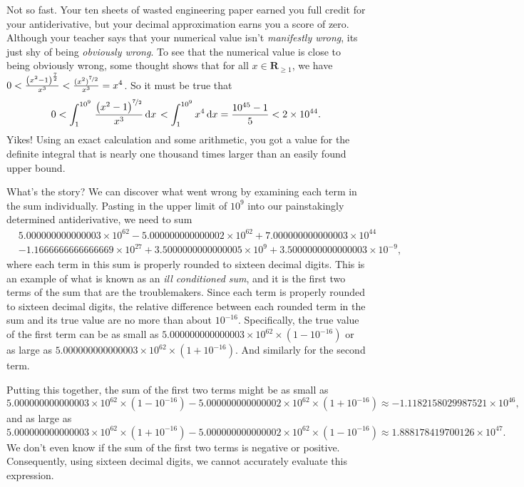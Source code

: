 \documentclass[12pt,fleqn]{article}
\newcommand{\reals}{\mathbf{R}}
\begin{document}
Not so fast. Your ten sheets of wasted engineering paper earned
you full credit for your antiderivative, but your
decimal approximation earns you a score of zero. Although your teacher says that 
your numerical value isn't \emph{manifestly wrong}, its 
just shy of being \emph{obviously wrong}. To see that the 
numerical value is close to being obviously wrong, some thought 
shows that for all $x \in \reals_{\geq 1}$, we have $0 < \frac{{{\left( {{x}^{2}}-1\right) }^{\frac{7}{2}}}}{{{x}^{3}}}
< \frac{(x^2)^{\nicefrac{7}{2}}} {x^3} = x^4$. So it must be true that
\begin{equation*}
   0 <  \int_1^{10^9} {\left. \frac{{{\left( {{x}^{2}}-1\right) }^{\nicefrac{7}{2}}}}{{{x}^{3}}} \, \mathrm{d}x\right.}
       < \int_1^{10^9} x^4 \, \mathrm{d}x =  \frac{10^{45} - 1 }{5} < 2  \times 10^{44}.
\end{equation*}
Yikes! Using an exact calculation and some arithmetic, you got a
value for the definite integral that is nearly one thousand times larger than
an easily found upper bound.

What's the story? We can discover what went wrong by examining each 
term in the sum individually. Pasting in the upper limit of $10^9$ into our 
painstakingly determined antiderivative, we need to sum
\begin{align*}
&5.000000000000003 \times  {{10}^{62}} - 5.000000000000002  \times 
{{10}^{62}} + 7.000000000000003 \times {{10}^{44}}  \\
&-1.1666666666666669 \times {{10}^{27}} + 
3.5000000000000005 \times {{10}^{9}} + 3.5000000000000003 \times {{10}^{-9}},
\end{align*}
where each term in this sum is properly rounded to sixteen 
decimal digits. This is an example of what is known as an \emph{ill conditioned sum}, and 
it is the first two terms of the sum that are the 
troublemakers. Since each term is properly rounded to sixteen 
decimal digits, the relative difference between 
each rounded term in the sum and its true value are no more than about 
$10^{-16}$. Specifically, the true value of the first term 
can be as small as $5.000000000000003 \times  {{10}^{62}} \times
(1 - 10^{-16})$ or as large as $5.000000000000003 \times  {{10}^{62}} 
\times (1 + 10^{-16})$. And similarly for the second term.

Putting this together, the sum of the first two terms might be as small
as 
\begin{equation*}
  5.000000000000003 \times 10^{62} \times (1 -  10^{-16}) - 5
   .000000000000002 \times 10^{62} \times  (1  + 10^{-16})
   \approx -1.1182158029987521 \times 10^{46},
\end{equation*}
and as large as 
\begin{equation*}
  5.000000000000003 \times 10^{62} \times (1 + 10^{-16}) - 5
   .000000000000002 \times 10^{62} \times  (1  - 10^{-16})
   \approx 1.888178419700126 \times {{10}^{47}}.
\end{equation*}
We don't even know if the sum of the first two terms is negative 
or positive. Consequently, using sixteen decimal digits, we cannot accurately
evaluate this expression.
\end{document}
